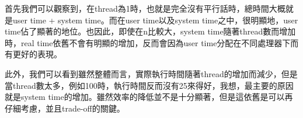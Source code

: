 \documentclass[12pt, a4paper]{article}
\begin{document}
首先我們可以觀察到，在thread為1時，也就是完全沒有平行話時，總時間大概就是user time + system time。而在user time以及system time之中，很明顯地，user time佔了顯著的地位。也因此，即使在n比較大，system time隨著thread數而增加時，real time依舊不會有明顯的增加，反而會因為user time分配在不同處理器下而有更好的表現。

此外，我們可以看到雖然整體而言，實際執行時間隨著thread的增加而減少，但是當thread數太多，例如100時，執行時間反而沒有25來得好，我想，最主要的原因就是system time的增加。雖然效率的降低並不是十分顯著，但是這依舊是可以再仔細考慮，並且trade-off的關鍵。
\end{document}
